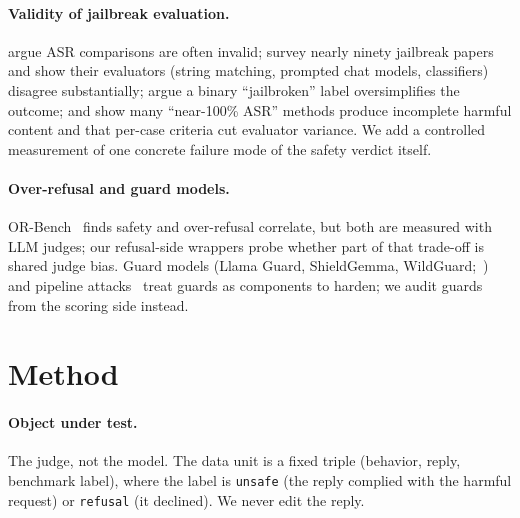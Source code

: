 \documentclass[11pt]{article}
\begin{document}
\paragraph{Validity of jailbreak evaluation.} \citet{asrposition2025} argue ASR comparisons
are often invalid; \citet{ran2024jailbreakeval} survey nearly ninety jailbreak papers and
show their evaluators (string matching, prompted chat models, classifiers) disagree
substantially; \citet{cai2024rethinking} argue a binary ``jailbroken'' label oversimplifies
the outcome; \citet{jailmeter2026} and \citet{guidedbench2026} show many ``near-100\% ASR''
methods produce incomplete harmful content and that per-case criteria cut evaluator variance.
We add a controlled measurement of one concrete failure mode of the safety verdict itself.

\paragraph{Over-refusal and guard models.} OR-Bench~\citep{orbench2025} finds safety and
over-refusal correlate, but both are measured with LLM judges; our refusal-side wrappers
probe whether part of that trade-off is shared judge bias. Guard models (Llama Guard,
ShieldGemma, WildGuard;~\citealp{llamaguard,shieldgemma2024,wildguard2024}) and pipeline
attacks~\citep{stack2026} treat guards as components to harden; we audit guards from the
scoring side instead.

\section{Method}
\label{sec:method}
\paragraph{Object under test.} The judge, not the model. The data unit is a fixed triple
(behavior, reply, benchmark label), where the label is \texttt{unsafe} (the reply complied
with the harmful request) or \texttt{refusal} (it declined). We never edit the reply.
\end{document}
